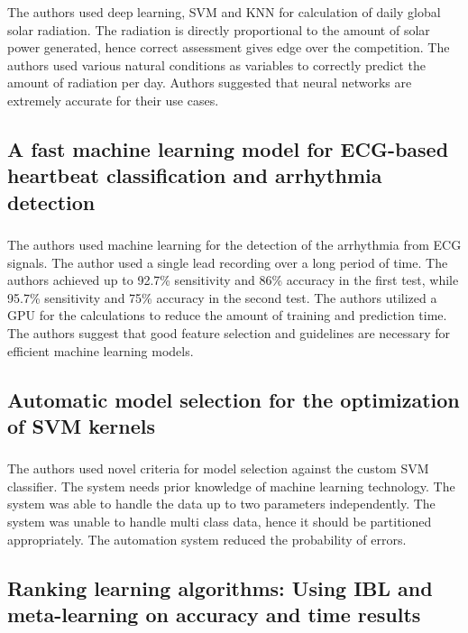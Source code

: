 The authors used deep learning, SVM and KNN for calculation of daily global solar radiation. The radiation is directly proportional to the amount of solar power generated, hence correct assessment gives edge over the competition. The authors used various natural conditions as variables to correctly predict the amount of radiation per day. Authors suggested that neural networks are extremely accurate for their use cases.

\subsection{A fast machine learning model for ECG-based heartbeat classification and arrhythmia detection}
\subsubsection{\citeauthor*{ref_paper_28} \citeyearpar{ref_paper_28}}

The authors used machine learning for the detection of the arrhythmia from ECG signals. The author used a single lead recording over a long period of time. The authors achieved up to 92.7\% sensitivity and 86\% accuracy in the first test, while 95.7\% sensitivity and 75\% accuracy in the second test. The authors utilized a GPU for the calculations to reduce the amount of training and prediction time. The authors suggest that good feature selection and guidelines are necessary for efficient machine learning models.

\subsection{Automatic model selection for the optimization of SVM kernels}
\subsubsection{\citeauthor*{ref_paper_3} \citeyearpar{ref_paper_3}}

The authors used novel criteria for model selection against the custom SVM classifier. The system needs prior knowledge of machine learning technology. The system was able to handle the data up to two parameters independently. The system was unable to handle multi class data, hence it should be partitioned appropriately. The automation system reduced the probability of errors.

\subsection{Ranking learning algorithms: Using IBL and meta-learning on accuracy and time results}
